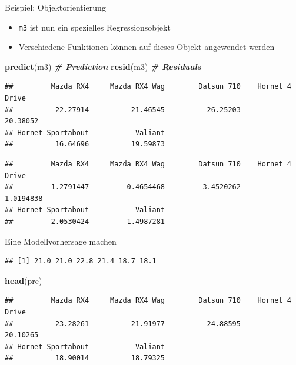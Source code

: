 \documentclass[
  ignorenonframetext,
]{beamer}
\newenvironment{Shaded}{\begin{snugshade}}{\end{snugshade}}
\newcommand{\CommentTok}[1]{\textcolor[rgb]{0.00,0.40,1.00}{\textbf{\textit{#1}}}}
\newcommand{\KeywordTok}[1]{\textcolor[rgb]{0.26,0.66,0.93}{\textbf{#1}}}
\newcommand{\NormalTok}[1]{\textcolor[rgb]{0.74,0.68,0.62}{#1}}
\newcommand{\OperatorTok}[1]{\textcolor[rgb]{0.74,0.68,0.62}{#1}}
\newcommand{\StringTok}[1]{\textcolor[rgb]{0.02,0.61,0.04}{#1}}
\providecommand{\tightlist}{%
  \setlength{\itemsep}{0pt}\setlength{\parskip}{0pt}}
\begin{document}
\begin{frame}[fragile]{Beispiel: Objektorientierung}
\protect\hypertarget{beispiel-objektorientierung}{}

\begin{itemize}
\tightlist
\item
  \texttt{m3} ist nun ein spezielles Regressionsobjekt
\item
  Verschiedene Funktionen können auf dieses Objekt angewendet werden
\end{itemize}

\begin{Shaded}
\begin{Highlighting}[]
\KeywordTok{predict}\NormalTok{(m3) }\CommentTok{# Prediction}
\KeywordTok{resid}\NormalTok{(m3) }\CommentTok{# Residuals}
\end{Highlighting}
\end{Shaded}

\begin{verbatim}
##         Mazda RX4     Mazda RX4 Wag        Datsun 710    Hornet 4 Drive 
##          22.27914          21.46545          26.25203          20.38052 
## Hornet Sportabout           Valiant 
##          16.64696          19.59873
\end{verbatim}

\begin{verbatim}
##         Mazda RX4     Mazda RX4 Wag        Datsun 710    Hornet 4 Drive 
##        -1.2791447        -0.4654468        -3.4520262         1.0194838 
## Hornet Sportabout           Valiant 
##         2.0530424        -1.4987281
\end{verbatim}

\end{frame}

\begin{frame}[fragile]{Eine Modellvorhersage machen}
\protect\hypertarget{eine-modellvorhersage-machen}{}

\begin{Shaded}
\end{Shaded}

\begin{verbatim}
## [1] 21.0 21.0 22.8 21.4 18.7 18.1
\end{verbatim}

\begin{Shaded}
\begin{Highlighting}[]
\KeywordTok{head}\NormalTok{(pre)}
\end{Highlighting}
\end{Shaded}

\begin{verbatim}
##         Mazda RX4     Mazda RX4 Wag        Datsun 710    Hornet 4 Drive 
##          23.28261          21.91977          24.88595          20.10265 
## Hornet Sportabout           Valiant 
##          18.90014          18.79325
\end{verbatim}

\end{frame}
\end{document}
